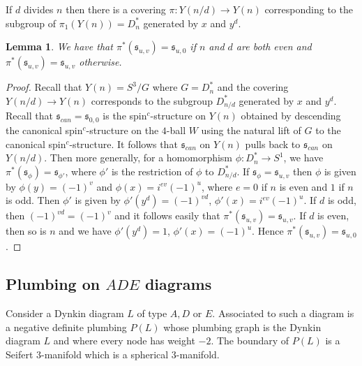 \documentclass{amsart}
\newtheorem{lemma}[theorem]{Lemma}
\theoremstyle{definition}
\theoremstyle{remark}
\numberwithin{equation}{section}
\begin{document}
If $d$ divides $n$ then there is a covering $\pi : Y(n/d) \to Y(n)$ corresponding to the subgroup of $\pi_1(Y(n)) = D_n^*$ generated by $x$ and $y^d$.

\begin{lemma}\label{lem:pullbackyn}
We have that $\pi^*( \mathfrak{s}_{u,v} ) = \mathfrak{s}_{u,0}$ if $n$ and $d$ are both even and $\pi^*(\mathfrak{s}_{u,v}) = \mathfrak{s}_{u,v}$ otherwise.
\end{lemma}
\begin{proof}
Recall that $Y(n) = S^3/G$ where $G = D_n^*$ and the covering $Y(n/d) \to Y(n)$ corresponds to the subgroup $D_{n/d}^*$ generated by $x$ and $y^d$. Recall that $\mathfrak{s}_{can} = \mathfrak{s}_{0,0}$ is the spin$^c$-structure on $Y(n)$ obtained by descending the canonical spin$^c$-structure on the $4$-ball $W$ using the natural lift of $G$ to the canonical spin$^c$-structure. It follows that $\mathfrak{s}_{can}$ on $Y(n)$ pulls back to $\mathfrak{s}_{can}$ on $Y(n/d)$. Then more generally, for a homomorphism $\phi : D_n^* \to S^1$, we have $\pi^*(\mathfrak{s}_{\phi}) = \mathfrak{s}_{\phi'}$, where $\phi'$ is the restriction of $\phi$ to $D^*_{n/d}$. If $\mathfrak{s}_{\phi} = \mathfrak{s}_{u,v}$ then $\phi$ is given by $\phi(y) = (-1)^v$ and $\phi(x) = i^{ev} (-1)^u$, where $e = 0$ if $n$ is even and $1$ if $n$ is odd. Then $\phi'$ is given by $\phi'(y^d) = (-1)^{vd}$, $\phi'(x) = i^{ev} (-1)^{u}$. If $d$ is odd, then $(-1)^{vd} = (-1)^v$ and it follows easily that $\pi^*( \mathfrak{s}_{u,v}) = \mathfrak{s}_{u,v}$. If $d$ is even, then so is $n$ and we have $\phi'(y^d) = 1$, $\phi'(x) = (-1)^u$. Hence $\pi^*(\mathfrak{s}_{u,v}) = \mathfrak{s}_{u,0}$.
\end{proof}


\subsection{Plumbing on $ADE$ diagrams}

Consider a Dynkin diagram $L$ of type $A,D$ or $E$. Associated to such a diagram is a negative definite plumbing $P(L)$ whose plumbing graph is the Dynkin diagram $L$ and where every node has weight $-2$. The boundary of $P(L)$ is a Seifert $3$-manifold which is a spherical $3$-manifold.
\end{document}
